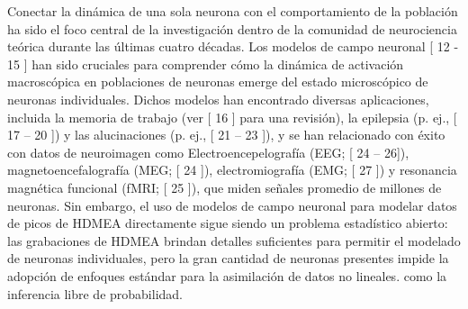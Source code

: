Conectar la dinámica de una sola neurona con el comportamiento de la población ha sido el foco central de la investigación dentro de la comunidad de neurociencia teórica durante las últimas cuatro décadas. Los modelos de campo neuronal [ 12 - 15 ] han sido cruciales para comprender cómo la dinámica de activación macroscópica en poblaciones de neuronas emerge del estado microscópico de neuronas individuales. Dichos modelos han encontrado diversas aplicaciones, incluida la memoria de trabajo (ver [ 16 ] para una revisión), la epilepsia (p. ej., [ 17 – 20 ]) y las alucinaciones (p. ej., [ 21 – 23 ]), y se han relacionado con éxito con datos de neuroimagen como Electroencepelografía (EEG; [ 24 – 26]), magnetoencefalografía (MEG; [ 24 ]), electromiografía (EMG; [ 27 ]) y resonancia magnética funcional (fMRI; [ 25 ]), que miden señales promedio de millones de neuronas. Sin embargo, el uso de modelos de campo neuronal para modelar datos de picos de HDMEA directamente sigue siendo un problema estadístico abierto: las grabaciones de HDMEA brindan detalles suficientes para permitir el modelado de neuronas individuales, pero la gran cantidad de neuronas presentes impide la adopción de enfoques estándar para la asimilación de datos no lineales. como la inferencia libre de probabilidad.


